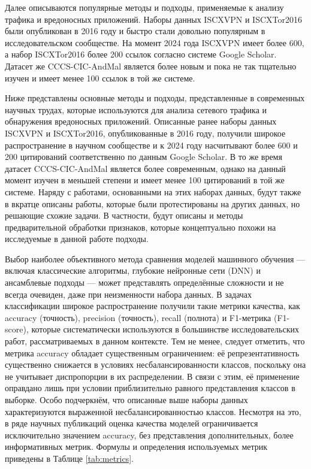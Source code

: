 Далее описываются популярные методы и подходы, применяемые к анализу трафика и вредоносных приложений. Наборы данных ISCXVPN и ISCXTor2016 были опубликован в 2016 году и быстро стали довольно популярным в исследовательском сообществе. На момент 2024 года ISCXVPN имеет более 600, а набор ISCXTor2016 более 200 ссылок согласно системе Google Scholar. Датасет же CCCS-CIC-AndMal является более новым и пока не так тщательно изучен и имеет менее 100 ссылок в той же системе. 

Ниже представлены основные методы и подходы, представленные в современных научных трудах, которые используются для анализа сетевого трафика и обнаружения вредоносных приложений. Описанные ранее наборы данных ISCXVPN и ISCXTor2016, опубликованные в 2016 году, получили широкое распространение в научном сообществе и к 2024 году насчитывают более 600 и 200 цитирований соответственно по данным Google Scholar. В то же время датасет CCCS-CIC-AndMal является более современным, однако на данный момент изучен в меньшей степени и имеет менее 100 цитирований в той же системе. Наряду с работами, основанными на этих наборах данных, будут также в вкратце описаны работы, которые были протестированы на других данных, но решающие схожие задачи. В частности, будут описаны и методы предварительной обработки признаков, которые концептуально похожи на исследуемые в данной работе подходы.


Выбор наиболее объективного метода сравнения моделей машинного обучения — включая классические алгоритмы, глубокие нейронные сети (DNN) и ансамблевые подходы — может представлять определённые сложности и не всегда очевиден, даже при неизменности набора данных. В задачах классификации широкое распространение получили такие метрики качества, как accuracy (точность), precision (точность), recall (полнота) и F1-метрика (F1-score), которые систематически используются в большинстве исследовательских работ, рассматриваемых в данном контексте. Тем не менее, следует отметить, что метрика accuracy обладает существенным ограничением: её репрезентативность существенно снижается в условиях несбалансированности классов, поскольку она не учитывает диспропорции в их распределении. В связи с этим, её применение оправдано лишь при условии приблизительно равного представления классов в выборке. Особо подчеркнём, что описанные выше наборы данных характеризуются выраженной несбалансированностью классов. Несмотря на это, в ряде научных публикаций оценка качества моделей ограничивается исключительно значением accuracy, без представления дополнительных, более информативных метрик. Формулы и определения используемых метрик приведены в Таблице \ref{tab:metrics}.


